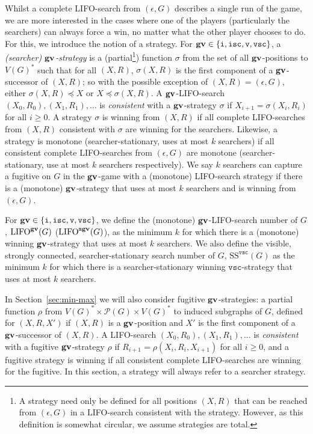 \documentclass{llncs}
\newcommand{\lifo}[1]{\textrm{LIFO}^{#1}}
\newcommand{\sstat}[1]{\textrm{SS}^{#1}}
\newcommand{\pow}[1]{\mathcal{P}(#1)}
\newcommand{\var}{\texttt{\bf gv}}
\newcommand{\ivar}{\texttt{i}}
\newcommand{\vvar}{\texttt{v}}
\newcommand{\iscvar}{\texttt{isc}}
\newcommand{\vscvar}{\texttt{vsc}}
\newcommand{\mvar}{\texttt{m}}
\begin{document}
Whilst a complete LIFO-search from $(\epsilon, G)$ describes a single run of the game, we are more interested in the cases where one of the players (particularly the searchers) can always force a win, no matter what the other player chooses to do.  For this, we introduce the notion of a strategy.  For $\var \in \{\ivar,\iscvar,\vvar,\vscvar\}$, a \emph{(searcher) $\var$-strategy} is a (partial\footnote{A strategy need only be defined for all positions $(X,R)$ that can be reached from $(\epsilon, G)$ in a LIFO-search consistent with the strategy.  However, as this definition is somewhat circular, we assume strategies are total.}) function $\sigma$ from the set of all $\var$-positions to $V(G)^*$ such that for all $(X,R)$, $\sigma(X,R)$ is the first component of a $\var$-successor of $(X,R)$; so with the possible exception of $(X,R) = (\epsilon, G)$, either $\sigma(X,R) \preceq X$ or $X \preceq \sigma(X,R)$.  A $\var$-LIFO-search $(X_0,R_0),(X_1,R_1),\ldots$ is \emph{consistent} with a $\var$-strategy $\sigma$ if $X_{i+1} = \sigma(X_i,R_i)$ for all $i \geq 0$.  A strategy $\sigma$ is winning from $(X,R)$ if all complete LIFO-searches from $(X,R)$ consistent with $\sigma$ are winning for the searchers.  Likewise, a strategy is monotone (searcher-stationary, uses at most $k$ searchers) if all consistent complete LIFO-searches from $(\epsilon, G)$ are monotone (searcher-stationary, use at most $k$ searchers respectively).  We say $k$ searchers can capture a fugitive on $G$ in the $\var$-game with a (monotone) LIFO-search strategy if there is a (monotone) $\var$-strategy that uses at most $k$ searchers and is winning from $(\epsilon, G)$. 

For $\var \in \{\ivar,\iscvar, \vvar, \vscvar\}$, we define the (monotone) $\var$-LIFO-search number of $G$, $\lifo{\var}(G)$ ($\lifo{\mvar\var}(G)$), as the minimum $k$ for which there is a (monotone) winning $\var$-strategy that uses at most $k$ searchers.  We also define the visible, strongly connected, searcher-stationary search number of $G$, $\sstat{\vscvar}(G)$ as the minimum $k$ for which there is a searcher-stationary winning $\vscvar$-strategy that uses at most $k$ searchers.  

In Section~\ref{sec:min-max} we will also consider fugitive $\var$-strategies: a partial function $\rho$ from $V(G)^* \times \pow{G} \times V(G)^*$ to induced subgraphs of $G$, defined for $(X,R,X')$ if $(X,R)$ is a $\var$-position and $X'$ is the first component of a $\var$-successor of $(X,R)$.  A LIFO-search $(X_0,R_0),(X_1,R_1),\ldots$ is \emph{consistent} with a fugitive $\var$-strategy $\rho$ if $R_{i+1} = \rho(X_i,R_i,X_{i+1})$ for all $i \geq 0$, and a fugitive strategy is winning if all consistent complete LIFO-searches are winning for the fugitive.   In this section, a strategy will always refer to a searcher strategy.
\end{document}
